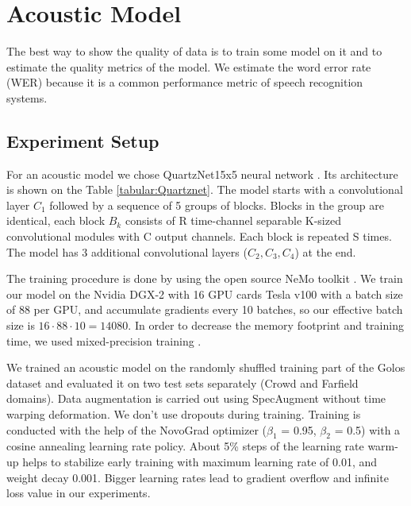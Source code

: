 \documentclass[a4paper]{article}
\begin{document}
\section{Acoustic Model}

The best way to show the quality of data is to train some model on it and to estimate the quality metrics of the model. We estimate the word error rate (WER) because it is a common performance metric of speech recognition systems.  

\subsection{Experiment Setup}

For an acoustic model we chose QuartzNet15x5 neural network \cite{kriman2020quartznet}. Its architecture is shown on the Table \ref{tabular:Quartznet}. The model starts with a convolutional layer $C_1$ followed by a sequence of 5 groups of blocks. Blocks in the group are identical, each block $B_k$ consists of R time-channel separable K-sized convolutional modules with C output channels. Each block is repeated S times. The model has 3 additional convolutional layers ($C_2, C_3, C_4$) at the end.

The training procedure is done by using the open source NeMo toolkit \cite{kuchaiev2019nemo}. We train our model on the Nvidia DGX-2 with 16 GPU cards Tesla v100 with a batch size of 88 per GPU, and accumulate gradients every 10 batches, so our effective batch size is $16 \cdot 88 \cdot 10 = 14080$. In order to decrease the memory footprint and training time, we used mixed-precision training \cite{micikevicius2017mixed}.

We trained an acoustic model on the randomly shuffled training part of the Golos dataset and evaluated it on two test sets separately (Crowd and Farfield domains). Data augmentation is carried out using SpecAugment \cite{park2019specaugment} without time warping deformation. We don't use dropouts during training. Training is conducted with the help of the NovoGrad \cite{ginsburg2019stochastic} optimizer ($\beta_1$ = 0.95, $\beta_2$ = 0.5) with a cosine annealing learning rate policy. About 5\% steps of the learning rate warm-up helps to stabilize early training with maximum learning rate of 0.01, and weight decay 0.001. Bigger learning rates lead to gradient overflow and infinite loss value in our experiments. 
\end{document}
